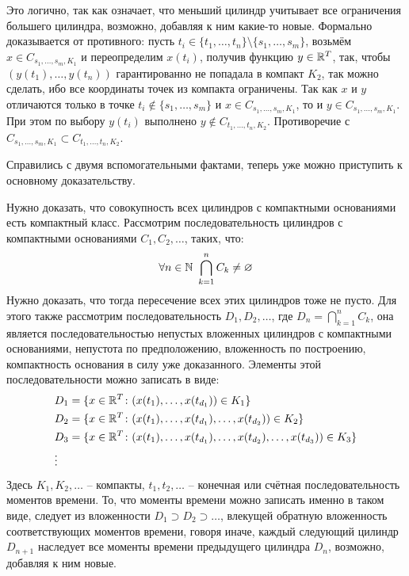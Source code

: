 \begin{solution}
\begin{enumerate}
        Это логично, так как означает, что меньший цилиндр учитывает все ограничения большего цилиндра, возможно, добавляя к ним какие-то новые. Формально доказывается от противного: пусть $t_i \in \{t_1, \dots, t_n\} \setminus \{s_1, \dots, s_m\}$, возьмём $x \in C_{s_1, \dots, s_m, K_1}$ и переопределим $x(t_i)$, получив функцию $y \in \mathbb{R}^T$, так, чтобы $(y(t_1), \dots, y(t_n))$ гарантированно не попадала в компакт $K_2$, так можно сделать, ибо все координаты точек из компакта ограничены. Так как $x$ и $y$ отличаются только в точке $t_i \notin \{s_1, \dots, s_m\}$ и $x \in C_{s_1, \dots, s_m, K_1}$, то и $y \in C_{s_1, \dots, s_m, K_1}$. При этом по выбору $y(t_i)$ выполнено $y \notin C_{t_1, \dots, t_n, K_2}$. Противоречие с $C_{s_1, \dots, s_m, K_1} \subset C_{t_1, \dots, t_n, K_2}$.

        Справились с двумя вспомогательными фактами, теперь уже можно приступить к основному доказательству.
        
        Нужно доказать, что совокупность всех цилиндров с компактными основаниями есть компактный класс. Рассмотрим последовательность цилиндров с компактными основаниями $C_1, C_2, \dots$, таких, что:
        \[
            \forall n \in \N \ \bigcap_{k=1}^n C_k \neq \emptyset
        \]
        Нужно доказать, что тогда пересечение всех этих цилиндров тоже не пусто. Для этого также рассмотрим последовательность $D_1, D_2, \dots$, где $D_n = \bigcap_{k=1}^n C_k$, она является последовательностью непустых вложенных цилиндров с компактными основаниями, непустота по предположению, вложенность по построению, компактность основания в силу уже доказанного. Элементы этой последовательности можно записать в виде:
        \begin{align*}
            & D_1 = \{x \in \mathbb{R}^T \colon (x(t_1), \dots, x(t_{d_1})) \in K_1\}
            \\
            & D_2 = \{x \in \mathbb{R}^T \colon (x(t_1), \dots, x(t_{d_1}), \dots, x(t_{d_2})) \in K_2\}
            \\
            & D_3 = \{x \in \mathbb{R}^T \colon (x(t_1), \dots, x(t_{d_1}), \dots, x(t_{d_2}), \dots, x(t_{d_3})) \in K_3\}
            \\
            & \vdots
        \end{align*}
        Здесь $K_1, K_2, \dots$ -- компакты, $t_1, t_2, \dots$ -- конечная или счётная последовательность моментов времени. То, что моменты времени можно записать именно в таком виде, следует из вложенности $D_1 \supset D_2 \supset \dots$, влекущей обратную вложенность соответствующих моментов времени, говоря иначе, каждый следующий цилиндр $D_{n+1}$ наследует все моменты времени предыдущего цилиндра $D_n$, возможно, добавляя к ним новые.


\end{enumerate}
\end{solution}
